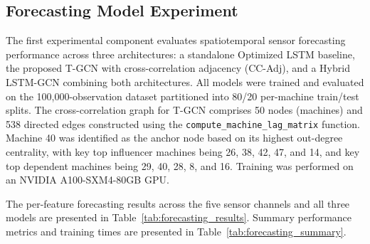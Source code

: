 \subsection{Forecasting Model Experiment}

The first experimental component evaluates spatiotemporal sensor forecasting performance across three architectures: a standalone Optimized LSTM baseline, the proposed T-GCN with cross-correlation adjacency (CC-Adj), and a Hybrid LSTM-GCN combining both architectures. All models were trained and evaluated on the 100,000-observation dataset partitioned into 80/20 per-machine train/test splits. The cross-correlation graph for T-GCN comprises 50 nodes (machines) and 538 directed edges constructed using the \texttt{compute\_machine\_lag\_matrix} function. Machine 40 was identified as the anchor node based on its highest out-degree centrality, with key top influencer machines being 26, 38, 42, 47, and 14, and key top dependent machines being 29, 40, 28, 8, and 16. Training was performed on an NVIDIA A100-SXM4-80GB GPU.

The per-feature forecasting results across the five sensor channels and all three models are presented in Table~\ref{tab:forecasting_results}. Summary performance metrics and training times are presented in Table~\ref{tab:forecasting_summary}.

